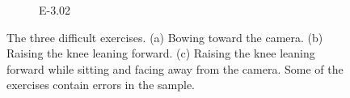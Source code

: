 \begin{figure}[ht]
\begin{subfigure}[b]{0.16\linewidth}
      \caption[]{E-3.02}
  \end{subfigure}
  \caption[Difficult Exercises]{The three difficult exercises. (a) Bowing toward the camera. (b) Raising the knee leaning forward. (c) Raising the knee leaning forward while sitting and facing away from the camera. Some of the exercises contain errors in the sample.}
  \label{fig:difficult_exercises}
\end{figure}
